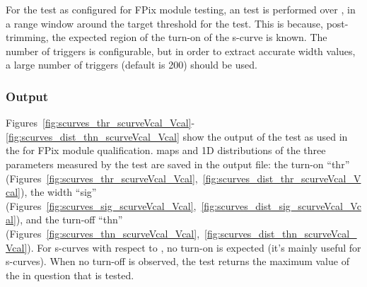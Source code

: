 For the \scurves test as configured for FPix module testing, 
an \scurves test is performed over \vcal, in a \vcal range window around the target threshold for the \trimming test.
This is because, post-trimming, the expected region of the turn-on of the s-curve is known.
The number of triggers is configurable, but in order to extract accurate width values, 
a large number of triggers (default is 200) should be used.

\subsubsection{Output}

Figures~\ref{fig:scurves_thr_scurveVcal_Vcal}-\ref{fig:scurves_dist_thn_scurveVcal_Vcal} 
show the output of the \scurves test as used in the \fulltest for FPix module qualification.
\roc maps and 1D distributions of the three parameters measured by the test are saved in the output file: 
the turn-on ``thr'' (Figures~\ref{fig:scurves_thr_scurveVcal_Vcal},~\ref{fig:scurves_dist_thr_scurveVcal_Vcal}),
the width ``sig'' (Figures~\ref{fig:scurves_sig_scurveVcal_Vcal},~\ref{fig:scurves_dist_sig_scurveVcal_Vcal}),
and the turn-off ``thn'' (Figures~\ref{fig:scurves_thn_scurveVcal_Vcal},~\ref{fig:scurves_dist_thn_scurveVcal_Vcal}).
For s-curves with respect to \vcal, no turn-on is expected (it's mainly useful for \vthrcomp s-curves).
When no turn-off is observed, the test returns the maximum value of the \dac in question that is tested.

